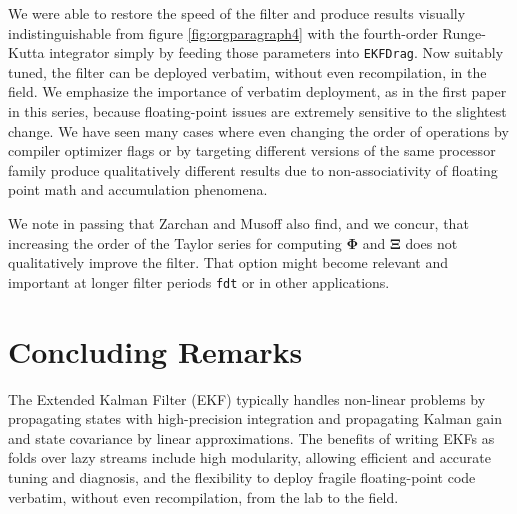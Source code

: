 \documentclass[10pt,oneside,x11names]{article}
\begin{document}
We were able to restore the speed of the filter and produce results visually
indistinguishable from figure \ref{fig:orgparagraph4} with the
fourth-order Runge-Kutta integrator simply by feeding those parameters into
\texttt{EKFDrag}. Now suitably tuned, the filter can be deployed verbatim, without even
recompilation, in the field. We emphasize the importance of verbatim deployment,
as in the first paper in this series, because floating-point issues are
extremely sensitive to the slightest change. We have seen many cases where even
changing the order of operations by compiler optimizer flags or by targeting
different versions of the same processor family produce qualitatively different
results due to non-associativity of floating point math and accumulation
phenomena. 

We note in passing that Zarchan and Musoff also find, and we concur, that
increasing the order of the Taylor series for computing \(\mathbold{\Phi}\) and
\(\mathbold{\Xi}\) does not qualitatively improve the filter. That option might
become relevant and important at longer filter periods \texttt{fdt} or in other
applications.

\section{Concluding Remarks}
\label{sec:orgheadline12}

The Extended Kalman Filter (EKF) typically handles non-linear problems by propagating
states with high-precision integration and propagating 
Kalman gain and state covariance by linear approximations. The benefits of
writing EKFs as folds over lazy streams include high modularity, allowing
efficient and accurate tuning and diagnosis, and the flexibility to deploy
fragile floating-point code verbatim, without even recompilation, from the lab
to the field.
\end{document}
